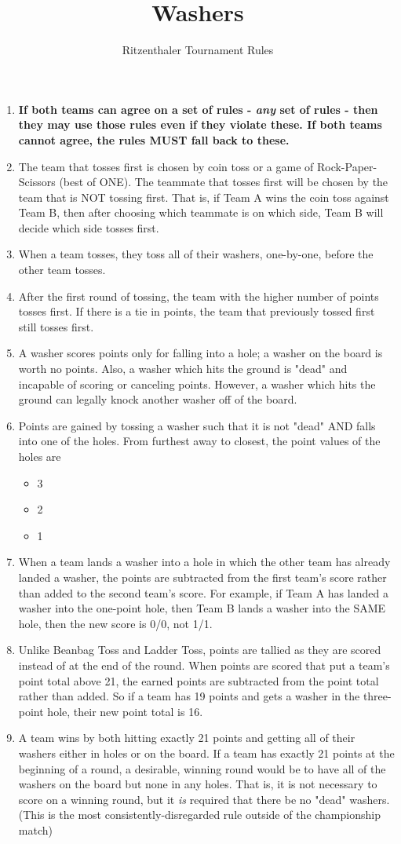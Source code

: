 \documentclass[a4paper]{article}
\title{Washers}
\author{Ritzenthaler Tournament Rules}
\begin{document}
\maketitle
\begin{enumerate}
\item \textbf{If both teams can agree on a set of rules - \textit{any} set of rules - then they may use those rules even if they violate these. If both teams cannot agree, the rules MUST fall back to these.}
\item The team that tosses first is chosen by coin toss or a game of Rock-Paper-Scissors (best of ONE). The teammate that tosses first will be chosen by the team that is NOT tossing first. That is, if Team A wins the coin toss against Team B, then after choosing which teammate is on which side, Team B will decide which side tosses first.
\item When a team tosses, they toss all of their washers, one-by-one, before the other team tosses.
\item After the first round of tossing, the team with the higher number of points tosses first. If there is a tie in points, the team that previously tossed first still tosses first.
\item A washer scores points only for falling into a hole; a washer on the board is worth no points. Also, a washer which hits the ground is "dead" and incapable of scoring or canceling points. However, a washer which hits the ground can legally knock another washer off of the board.
\item Points are gained by tossing a washer such that it is not "dead" AND falls into one of the holes. From furthest away to closest, the point values of the holes are
\begin{itemize}
	\item 3
	\item 2
	\item 1
\end{itemize}
\item When a team lands a washer into a hole in which the other team has already landed a washer, the points are subtracted from the first team's score rather than added to the second team's score. For example, if Team A has landed a washer into the one-point hole, then Team B lands a washer into the SAME hole, then the new score is 0/0, not 1/1.
\item Unlike Beanbag Toss and Ladder Toss, points are tallied as they are scored instead of at the end of the round. When points are scored that put a team's point total above 21, the earned points are subtracted from the point total rather than added. So if a team has 19 points and gets a washer in the three-point hole, their new point total is 16.
\item A team wins by both hitting exactly 21 points and getting all of their washers either in holes or on the board. If a team has exactly 21 points at the beginning of a round, a desirable, winning round would be to have all of the washers on the board but none in any holes. That is, it is not necessary to score on a winning round, but it \textit{is} required that there be no "dead" washers. (This is the most consistently-disregarded rule outside of the championship match)
\end{enumerate}
\end{document}
